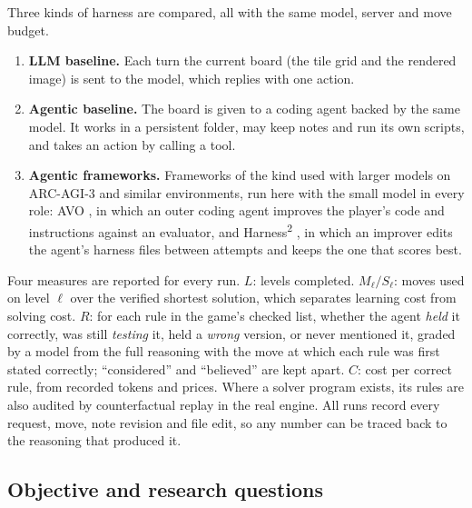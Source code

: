\documentclass[11pt,a4paper]{article}
\newcommand{\hsq}{Harness\textsuperscript{2}}
\begin{document}
Three kinds of harness are compared, all with the same model, server and move
budget.
\begin{enumerate}[leftmargin=1.5em]
  \item \textbf{LLM baseline.} Each turn the current board (the tile grid and
  the rendered image) is sent to the model, which replies with one action.
  \item \textbf{Agentic baseline.} The board is given to a coding agent
  backed by the same model. It works in a persistent folder, may keep notes
  and run its own scripts, and takes an action by calling a tool.
  \item \textbf{Agentic frameworks.} Frameworks of the kind used with larger
  models on ARC-AGI-3 and similar environments, run here with the small model
  in every role: AVO \citep{chen2026avo,nvidia2026avoarc}, in which an outer
  coding agent improves the player's code and instructions against an
  evaluator, and \hsq{} \citep{xu2026harness2}, in which an improver edits
  the agent's harness files between attempts and keeps the one that scores
  best.
\end{enumerate}

Four measures are reported for every run. $L$: levels completed. $M_\ell/S_\ell$:
moves used on level $\ell$ over the verified shortest solution, which
separates learning cost from solving cost. $R$: for each rule in the game's
checked list, whether the agent \emph{held} it correctly, was still
\emph{testing} it, held a \emph{wrong} version, or never mentioned it, graded
by a model from the full reasoning with the move at which each rule was first
stated correctly; ``considered'' and ``believed'' are kept apart. $C$: cost per
correct rule, from recorded tokens and prices. Where a solver program exists,
its rules are also audited by counterfactual replay in the real engine. All
runs record every request, move, note revision and file edit, so any number
can be traced back to the reasoning that produced it.

\subsection{Objective and research questions}
\end{document}
